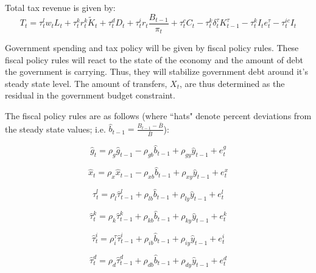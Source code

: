 \documentclass[article,11pt,letterpaper,fleqn]{article}
\theoremstyle{definition}
\numberwithin{equation}{section}
\begin{document}
Total tax revenue is given by:
\begin{equation}\label{tax_rev}
  T_{t} = \tau^{l}_{t}w_{t}L_{t} + \tau^{k}_{t}r^{k}_{t}\tilde{K}_{t} + \tau^{d}_{t}D_{t} + \tau^{i}_{t}r_{t}\frac{B_{t-1}}{\pi_{t}} + \tau^{c}_{t}C_{t} - \tau^{k}_{t}\delta^{\tau}_{t}K^{\tau}_{t-1} - \tau^{k}_{t}I_{t}e^{\tau}_{t} - \tau^{ic}_{t}I_{t}
\end{equation}

Government spending and tax policy will be given by fiscal policy rules.  These fiscal policy rules will react to the state of the economy and the amount of debt the government is carrying.  Thus, they will stabilize government debt around it's steady state level.  The amount of transfers, $X_{t}$, are thus determined as the residual in the government budget constraint.

The fiscal policy rules are as follows (where ``hats" denote percent deviations from the steady state values; i.e. $\hat{b}_{t-1}=\frac{B_{t-1}-\bar{B}}{\bar{B}}$):

\begin{equation}\label{gov_spend}
\hat{g}_{t} = \rho_{g}\hat{g}_{t-1} - \rho_{gb}\hat{b}_{t-1} + \rho_{gy}\hat{y}_{t-1} + e^{g}_{t} 
\end{equation}

\begin{equation}\label{transfers}
\hat{x}_{t} = \rho_{x}\hat{x}_{t-1} - \rho_{xb}\hat{b}_{t-1} + \rho_{xy}\hat{y}_{t-1} + e^{x}_{t}  
\end{equation}

\begin{equation}\label{labor_tax}
\hat{\tau}^{l}_{t} = \rho_{l}\hat{\tau}^{l}_{t-1} + \rho_{lb}\hat{b}_{t-1} + \rho_{ly}\hat{y}_{t-1} + e^{l}_{t} 
\end{equation}

\begin{equation}\label{capital_tax}
\hat{\tau}^{k}_{t} = \rho_{k}\hat{\tau}^{k}_{t-1} + \rho_{kb}\hat{b}_{t-1} + \rho_{ky}\hat{y}_{t-1} + e^{k}_{t} 
\end{equation}

\begin{equation}\label{interest_tax}
\hat{\tau}^{i}_{t} = \rho^{\tau}_{i}\hat{\tau}^{i}_{t-1} + \rho_{ib}\hat{b}_{t-1} + \rho_{iy}\hat{y}_{t-1} + e^{i}_{t} 
\end{equation}

\begin{equation}\label{dividend_tax}
\hat{\tau}^{d}_{t} = \rho_{d}\hat{\tau}^{d}_{t-1} + \rho_{db}\hat{b}_{t-1} + \rho_{dy}\hat{y}_{t-1} + e^{d}_{t} 
\end{equation}
\end{document}
